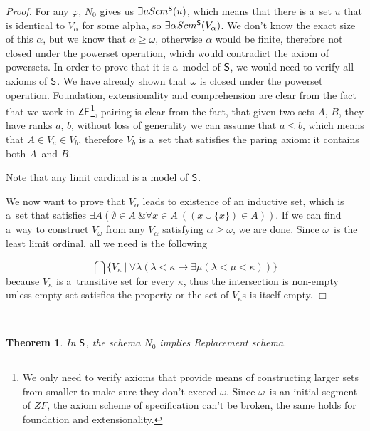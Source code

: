 \documentclass[12pt,a4paper]{article}
\newtheorem{theorem}{Theorem}[section]
\newenvironment{proof}
{\noindent \textit{Proof.}}
{\hspace*{\fill} $\Box$}
\newcommand{\then}{\rightarrow}
\begin{document}
\begin{proof}
For any $\varphi$, $N_0$ gives us $\exists u Scm^{\sf{S}}(u)$, which means that there is a~set $u$ that is identical to $V_\alpha$ for some alpha, so $\exists \alpha Scm^{\sf{S}}(V_\alpha)$.
We don't know the exact size of this $\alpha$, but we know that $\alpha \geq \omega$, otherwise $\alpha$ would be finite, therefore not closed under the powerset operation, which would contradict the axiom of powersets. 
In order to prove that it is a~model of $\sf{S}$, we would need to verify all axioms of $\sf{S}$. We have already shown that $\omega$ is closed under the powerset operation. Foundation, extensionality and comprehension are clear from the fact that we work in $\sf{ZF}$\footnote{We only need to verify axioms that provide means of constructing larger sets from smaller to make sure they don't exceed $\omega$. Since $\omega$ is an initial segment of $ZF$, the axiom scheme of specification can't be broken, the same holds for foundation and extensionality.}, pairing is clear from the fact, that given two sets $A$, $B$, they have ranks $a$, $b$, without loss of generality we can assume that $a \leq b$, which means that $A \in V_a \in V_b$, therefore $V_b$ is a~set that satisfies the paring axiom: it contains both $A$ and $B$.

Note that any limit cardinal is a model of $\sf{S}$.

We now want to prove that $V_\alpha$ leads to existence of an inductive set, which is a~set that satisfies $\exists A(\emptyset \in A~\& \forall  x \in A~((x \cup \{ x\}) \in A))$. If we can find a~way to construct $V_\omega$ from any $V_\alpha$ satisfying $\alpha \geq \omega$, we are done. Since $\omega$ is the least limit ordinal, all we need is the following

\begin{equation}
\bigcap \{V_\kappa\ |\  \forall \lambda(\lambda < \kappa \then \exists \mu(\lambda < \mu < \kappa))\}
\end{equation}
because $V_\kappa$ is a~transitive set for every $\kappa$, thus the intersection is non-empty unless empty set satisfies the property or the set of $V_\kappa$s is itself empty.
\end{proof}

\

\begin{theorem}
In $\sf{S}$, the schema $N_0$ implies Replacement schema.
\end{theorem}
\end{document}

